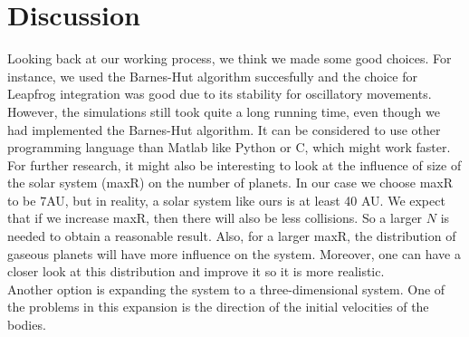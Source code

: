 \section{Discussion}
Looking back at our working process, we think we made some good choices.
For instance, we used the Barnes-Hut algorithm succesfully and the choice for Leapfrog integration was good due to its stability for oscillatory movements.\\

However, the simulations still took quite a long running time, even though we had implemented the Barnes-Hut algorithm. It can be considered to use other programming language than Matlab like Python or C, which might work faster.\\

For further research, it might also be interesting to look at the influence of size of the solar system (maxR) on the number of planets. In our case we choose maxR to be $7$AU, but in reality, a solar system like ours is at least 40 AU. We expect that if we increase maxR, then there will also be less collisions. So a larger $N$ is needed to obtain a reasonable result. Also, for a larger maxR, the distribution of gaseous planets will have more influence on the system. Moreover, one can have a closer look at this distribution and improve it so it is more realistic.\\

Another option is expanding the system to a three-dimensional system.
One of the problems in this expansion is the direction of the initial velocities of the bodies.




